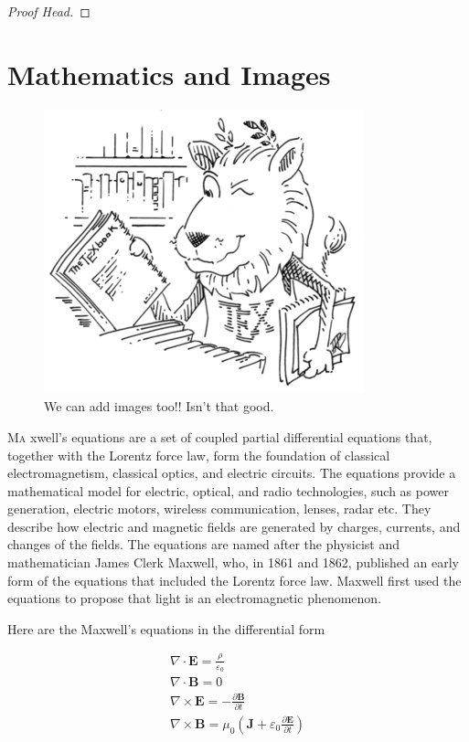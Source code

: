 \documentclass{package/notes}
\begin{document}
\begin{problem}%
	\lipsum[1][1-3] %
\end{problem}
\begin{proof}[Proof Head]
	\lipsum[1][1-10] %
\end{proof}
\nocite{knuthwebsite}

\section{Mathematics and Images}
\begin{figure}[!h]
	\centering
	\includegraphics[height = 0.5\textwidth]{resource/ctan_lion.png}
	\caption{We can add images too!! Isn't that good.}
	\label{img:anything}
\end{figure}

\lettrine{M}{a} xwell's equations are a set of coupled partial differential equations that, together with the Lorentz force law, form the foundation of classical electromagnetism, 
classical optics, and electric circuits. The equations provide a mathematical model for electric, optical, and radio technologies, such as power generation, electric
 motors, wireless communication, lenses, radar etc. They describe how electric and magnetic fields are generated by charges, currents, and changes of the fields.
  The equations are named after the physicist and mathematician James Clerk Maxwell, who, in 1861 and 1862, published an early form of the equations that included 
  the Lorentz force law. Maxwell first used the equations to propose that light is an electromagnetic phenomenon. 

  Here are the Maxwell's equations in the differential form

\[
\begin{gathered}
	\nabla \cdot \mathbf {E} ={\frac {\rho }{\varepsilon _{0}}} \\
	 \nabla \cdot \mathbf {B} ={0} \\ \tag*{(1)}
	\nabla \times \mathbf {E} =-{\frac {\partial \mathbf {B} }{\partial t}}\\
	 \nabla \times \mathbf {B} =\mu _{0}\left(\mathbf {J} +\varepsilon _{0}{\frac {\partial \mathbf {E} }{\partial t}}\right)
\end{gathered}
\]





\pagebreak

\medskip

\printbibliography[heading=bibintoc,title={\centering Bibliography}]
\end{document}
